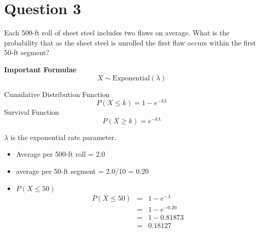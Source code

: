 \documentclass[a4paper,12pt]{article}
\begin{document}
\large 

\section*{Question 3}
Each 500-ft roll of sheet steel includes two flaws on average. 
What is the probability that as the sheet steel is unrolled the first flaw occurs within the first 50-ft segment?

\vspace{0.25cm}


\begin{framed}
\large 
\noindent \textbf{Important Formulae}\\

\[ X \sim \mbox{Exponential}(\lambda)\]

\noindent Cumulative Distribution Function
\[
P( X \leq k) = 1 -e^{-k\lambda }\]
\medskip 
\noindent Survival Function
\[
P( X \geq k) =e^{-k \lambda }\]
\medskip

\noindent $\lambda$ is the exponential rate parameter.

\end{framed}




\begin{itemize}
\item Average per 500-ft roll = 2.0
\item average per 50-ft segment = 2.0/10 = 0.20
\item $P(X \leq 50)$
\begin{eqnarray*} 
P(X \leq 50) &=& 1 - e^{-\lambda} \\
&=& 1 - e^{-0.20}\\ 
&=& 1-0.81873 \\
&=& 0.18127\\
\end{eqnarray*}
\end{itemize}
\end{document}
